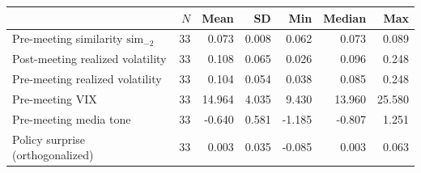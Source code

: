 \begin{tabular}{lrrrrrr}
\toprule
 & $N$ & Mean & SD & Min & Median & Max \\
\midrule
Pre-meeting similarity $\mathrm{sim}_{-2}$ & 33 & 0.073 & 0.008 & 0.062 & 0.073 & 0.089 \\
Post-meeting realized volatility & 33 & 0.108 & 0.065 & 0.026 & 0.096 & 0.248 \\
Pre-meeting realized volatility & 33 & 0.104 & 0.054 & 0.038 & 0.085 & 0.248 \\
Pre-meeting VIX & 33 & 14.964 & 4.035 & 9.430 & 13.960 & 25.580 \\
Pre-meeting media tone & 33 & -0.640 & 0.581 & -1.185 & -0.807 & 1.251 \\
Policy surprise (orthogonalized) & 33 & 0.003 & 0.035 & -0.085 & 0.003 & 0.063 \\
\bottomrule
\end{tabular}
